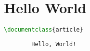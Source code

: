\section{Hello World}

\begin{lstlisting}[language=TeX]
    \documentclass{article}
    
        Hello, World!
    
\end{lstlisting}